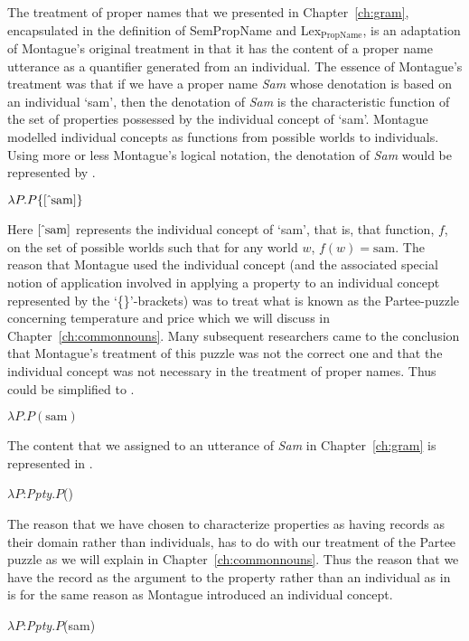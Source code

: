 The treatment of proper names that we presented in
Chapter~\ref{ch:gram}, encapsulated in the definition of SemPropName
and Lex$_{\mathrm{PropName}}$, is an adaptation of Montague's
original treatment in that it has the content of a proper name utterance
as a quantifier generated from an individual.  The essence of
Montague's treatment was that if we have a proper name \textit{Sam}
whose denotation is based on an individual `sam', then the denotation
of \textit{Sam} is the characteristic function of the set of
properties possessed by the individual concept of `sam'.  Montague
modelled individual concepts as functions from possible worlds to
individuals.  Using more or less Montague's logical notation, the denotation of
\textit{Sam} would be represented by \nexteg{}.
\begin{ex} 
$\lambda P.P\{[\,\hat{}\,\mathrm{sam}]\}$ 
\label{ex:MontagueSam}
\end{ex} 
Here $[\,\hat{}\,\mathrm{sam}]$ represents the individual concept of `sam',
that is,
that function, $f$, on the set of possible worlds such that for any
world $w$, $f(w)=\mathrm{sam}$.  The reason that Montague used the
individual concept (and the associated special notion of application
involved in applying a property to an individual concept represented
by the `\{\}'-brackets) was to treat what is known as the Partee-puzzle
concerning temperature and price which we will discuss in Chapter~\ref{ch:commonnouns}.  Many
subsequent researchers came to the conclusion that Montague's treatment of
this puzzle was not the correct one and that the individual concept
was not necessary in the treatment of proper names.  Thus \preveg{}
could be simplified to \nexteg{}.
\begin{ex} 
$\lambda P.P(\mathrm{sam})$ 
\end{ex} 
The content that we assigned to an utterance of \textit{Sam} in
Chapter~\ref{ch:gram} is represented in \nexteg{}.
\begin{ex} 
$\lambda P$:\textit{Ppty}.$P$() 
\end{ex} 
The reason that we have chosen to characterize properties as having
records as their domain rather than individuals, has to do with our
treatment of the Partee puzzle as we will explain in Chapter~\ref{ch:commonnouns}.  Thus the
reason that we have the record  as the
argument to the property rather than an individual as in \nexteg{} is for the same reason as
Montague introduced an individual concept.
\begin{ex} 
$\lambda P$:\textit{Ppty}.$P$(sam) 
\end{ex} 
